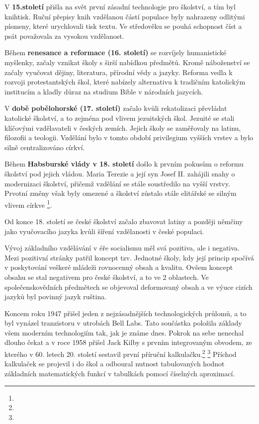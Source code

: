 \documentclass[a4paper,12pt,twoside,FP]{article}
\begin{document}
V \textbf{15.století} přišla na svět první zásadní technologie pro školství, a tím byl knihtisk. Ruční přepisy knih vzdělanou částí populace byly nahrazeny odlitými písmeny, které urychlovali tisk textu.  Ve středověku se pouhá schopnost číst a psát považovala za vysokou vzdělanost. 

Během \textbf{renesance a reformace (16. století)} se rozvíjely humanistické myšlenky, začaly vznikat školy s širší nabídkou předmětů. Kromě náboženství se začaly vyučovat dějiny, literatura, přírodní vědy a jazyky. Reforma vedla k rozvoji protestantských škol, které nabízely alternativu k tradičním katolickým institucím a kladly důraz na studium Bible v národních jazycích.

V \textbf{době pobělohorské (17. století)} začalo kvůli rekatolizaci převládat katolické školství, a to zejména pod vlivem jezuitských škol. Jezuité se stali klíčovými vzdělavateli v českých zemích. Jejich školy se zaměřovaly na latinu, filozofii a teologii. Vzdělání bylo v tomto období privilegium vyšších vrstev a bylo silně centralizováno církví.

Během \textbf{Habsburské vlády v 18. století} došlo k prvním pokusům o reformu školství pod jejich vládou. Maria Terezie a její syn Josef II. zahájili snahy o modernizaci školství, přičemž vzdělání se stále soustředilo na vyšší vrstvy. Prvotní změny však byly omezené a školství zůstalo stále elitářské se silným vlivem církve \footnote{}.

Od konce 18. století se české školství začalo zbavovat latiny a později němčiny jako vyučovacího jazyka kvůli šíření vzdělanosti v české populaci.

Vývoj základního vzdělávání v éře socialismu měl svá pozitiva, ale i negativa. Mezi pozitivní stránky patřil koncept tzv. Jednotné školy, kdy její princip spočívá v poskytování veškeré mládeži rovnocenný obsah a kvalitu. Ovšem koncept obsahu se stal negativem pro české školství, a to ve 2 oblastech. Ve společenskovědních předmětech se objevoval deformovaný obsah a ve výuce cizích jazyků byl povinný jazyk ruština.

Koncem roku 1947 přišel jeden z nejzásadnějších technologických průlomů, a to byl vynázel tranzistoru v utrobách Bell Labs. Tato součástka položila základy všem moderním technologiím tak, jak je známe dnes. Pokrok na sebe nenechal dlouho čekat a v roce 1958 přišel Jack Kilby s prvním integrovaným obvodem, ze kterého v 60. letech 20. století sestavil první příruční kalkulačku.\footnote{} \footnote{} Příchod kalkulaček se projevil i do škol a odboural nutnost tabulovaných hodnot základních matematických funkcí v tabulkách pomocí číselných aproximací.
\end{document}
